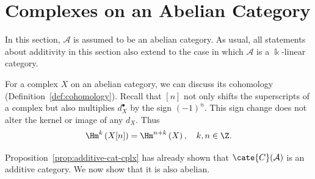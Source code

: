 
\section{Complexes on an Abelian Category}\label{sec:Abel-cplx}
\hypertarget{o014.aljabr2.chapter3.abelian-category-complexes}{ }

In this section, $\mathcal{A}$ is assumed to be an abelian category. As usual,
all statements about additivity in this section also extend to the case in
which $\mathcal{A}$ is a $\Bbbk$-linear category.

For a complex $X$ on an abelian category, we can discuss its cohomology
(Definition~\ref{def:cohomology}). Recall that $[n]$ not only shifts the
superscripts of a complex but also multiplies $d_X^\bullet$ by the sign
$(-1)^n$. This sign change does not alter the kernel or image of any $d_X$.
Thus
\[ \Hm^k\left( X[n] \right) = \Hm^{n+k} \left(X \right), \quad k, n \in \Z . \]

Proposition~\ref{prop:additive-cat-cplx} has already shown that
$\cate{C}(\mathcal{A})$ is an additive category. We now show that it is also
abelian.

